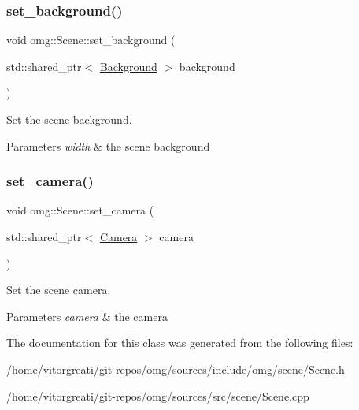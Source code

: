 \subsubsection{\texorpdfstring{set\_background()}{set\_background()}}
{\footnotesize\ttfamily void omg\+::\+Scene\+::set\+\_\+background (\begin{DoxyParamCaption}\item[{std\+::shared\+\_\+ptr$<$ \mbox{\hyperlink{classomg_1_1_background}{Background}} $>$}]{background }\end{DoxyParamCaption})\hspace{0.3cm}{\ttfamily [inline]}}



Set the scene background. 


\begin{DoxyParams}{Parameters}
{\em width} & the scene background \\
\hline
\end{DoxyParams}
\mbox{\label{classomg_1_1_scene_a07875fddcc199bc2f70b1c20fd294af4}} 
\subsubsection{\texorpdfstring{set\_camera()}{set\_camera()}}
{\footnotesize\ttfamily void omg\+::\+Scene\+::set\+\_\+camera (\begin{DoxyParamCaption}\item[{std\+::shared\+\_\+ptr$<$ \mbox{\hyperlink{classomg_1_1_camera}{Camera}} $>$}]{camera }\end{DoxyParamCaption})\hspace{0.3cm}{\ttfamily [inline]}}



Set the scene camera. 


\begin{DoxyParams}{Parameters}
{\em camera} & the camera \\
\hline
\end{DoxyParams}


The documentation for this class was generated from the following files\+:\begin{DoxyCompactItemize}
\item 
/home/vitorgreati/git-\/repos/omg/sources/include/omg/scene/Scene.\+h\item 
/home/vitorgreati/git-\/repos/omg/sources/src/scene/Scene.\+cpp\end{DoxyCompactItemize}
